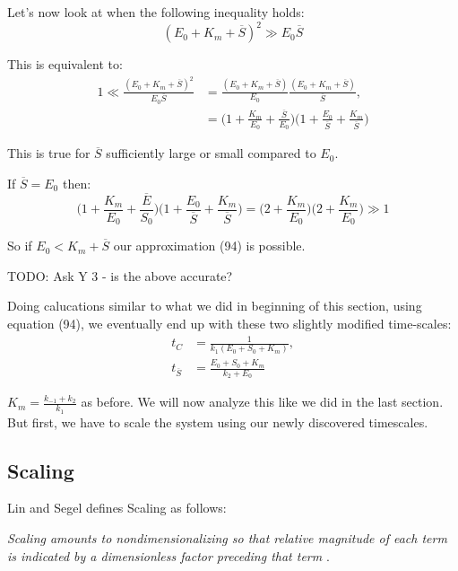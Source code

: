 \documentclass[12pt]{article}
\begin{document}
Let's now look at when the following inequality holds:
\begin{equation}
(E_0 + K_m + \overline{S})^2 \gg E_0 \overline{S}
\end{equation}

This is equivalent to:
\begin{align}
1 \ll
  \frac{(E_0 + K_m + \overline{S})^2}
           {E_0 \overline{S}} &= 
\frac{(E_0 + K_m + \overline{S})}
      {E_0} \frac{(E_0 + K_m + \overline{S})}{\overline{S}}, \\
&= \Big(1 + \frac{K_m}{E_0} + \frac{\overline{S}}{E_0}\Big)
   \Big(1 + \frac{E_0}{\overline{S}} + \frac{K_m}{\overline{S}}\Big)
\end{align}

This is true for $\overline{S}$ sufficiently large or small compared
to $E_0$.

If $\overline{S} = E_0$ then:
\begin{equation}
\Big(1 + \frac{K_m}{E_0} + \frac{\overline{E}}{S_0}\Big)\Big(1 + \frac{E_0}{\overline{S}} + \frac{K_m}{\overline{S}}\Big) = \Big(2 + \frac{K_m}{E_0}\Big) \Big(2 + \frac{K_m}{E_0}\Big) \gg 1
\end{equation}

So if $E_0 < K_m + \overline{S}$ our approximation (94) is possible.

TODO: Ask Y 3 - is the above accurate?

Doing calucations similar to what we did in beginning of this section,
using equation (94), we eventually end up with these two slightly
modified time-scales:
\begin{align}
t_C &= \frac{1}{k_1(E_0+S_0+K_m)}, \\
t_{\overline{S}} &= \frac{E_0+S_0+K_m}{k_2+E_0}
\end{align}

$K_m = \frac{k_{-1}+k_2}{k_1}$ as before. We will now analyze this
like we did in the last section. But first, we have to scale the
system using our newly discovered timescales.

\subsection{Scaling}

Lin and Segel defines Scaling as follows:

\textit{Scaling amounts to nondimensionalizing so that relative magnitude of
each term is indicated by a dimensionless factor preceding that term}
\cite{lin1974mathematics}.
\end{document}
